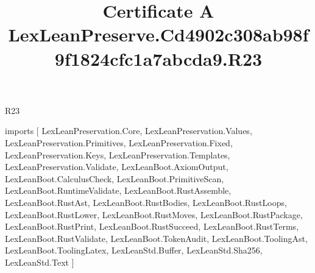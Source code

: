 \begin{lexlean}{R23}
\title{Certificate A LexLeanPreserve.Cd4902c308ab98f9f1824cfc1a7abcda9.R23}
\begin{coremodule}
imports [
  LexLeanPreservation.Core,
  LexLeanPreservation.Values,
  LexLeanPreservation.Primitives,
  LexLeanPreservation.Fixed,
  LexLeanPreservation.Keys,
  LexLeanPreservation.Templates,
  LexLeanPreservation.Validate,
  LexLeanBoot.AxiomOutput,
  LexLeanBoot.CalculusCheck,
  LexLeanBoot.PrimitiveScan,
  LexLeanBoot.RuntimeValidate,
  LexLeanBoot.RustAssemble,
  LexLeanBoot.RustAst,
  LexLeanBoot.RustBodies,
  LexLeanBoot.RustLoops,
  LexLeanBoot.RustLower,
  LexLeanBoot.RustMoves,
  LexLeanBoot.RustPackage,
  LexLeanBoot.RustPrint,
  LexLeanBoot.RustSucceed,
  LexLeanBoot.RustTerms,
  LexLeanBoot.RustValidate,
  LexLeanBoot.TokenAudit,
  LexLeanBoot.ToolingAst,
  LexLeanBoot.ToolingLatex,
  LexLeanStd.Buffer,
  LexLeanStd.Sha256,
  LexLeanStd.Text
]


\end{coremodule}
\end{lexlean}
